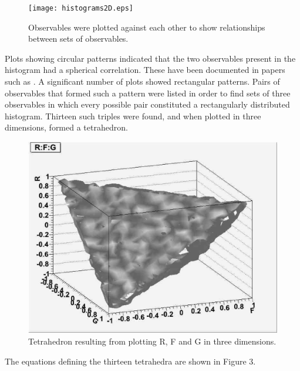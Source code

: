 \documentclass[a4paper,12pt]{article}
\begin{document}
\begin{figure}[!ht]
 \begin{center}
  \texttt{[image: histograms2D.eps]}
  \caption{Observables were plotted against each other to show relationships between sets of observables.}
 \end{center}
\end{figure}

Plots showing circular patterns indicated that the two observables present in the histogram had a spherical correlation.  These have been documented in papers such as \cite{info, spin}. A significant number of plots showed rectangular patterns.  Pairs of observables that formed such a pattern were listed in order to find sets of three observables in which every possible pair constituted a rectangularly distributed histogram.  Thirteen such triples were found, and when plotted in three dimensions, formed a tetrahedron.

\begin{figure}[!h]
 \begin{center}
  \includegraphics[scale=0.25]{RFG.eps}
  \caption{Tetrahedron resulting from plotting R, F and G in three dimensions.}
 \end{center}
\end{figure}

The equations defining the thirteen tetrahedra are shown in Figure 3.
\end{document}

